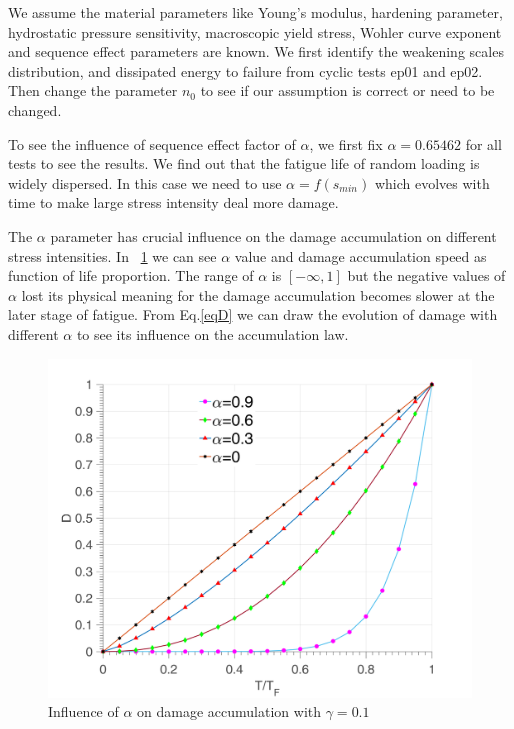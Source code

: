 \documentclass[3p,times,number,review]{elsarticle}
\newcommand{\figref}[1]{\figurename~\ref{#1}}
\begin{document}
We assume the material parameters like Young's modulus, hardening parameter, hydrostatic pressure sensitivity, macroscopic yield stress, Wohler curve exponent and sequence effect parameters are known. We first identify the weakening scales distribution, and dissipated energy to failure from cyclic tests ep01 and ep02. Then change the parameter $n_0$ to see if our assumption is correct or need to be changed. 

To see the influence of sequence effect factor of $\alpha$, we first fix $\alpha=0.65462$ for all tests to see the results. We find out that the fatigue life of random loading is widely dispersed. In this case we need to use $\alpha=f(s_{min})$ which evolves with time to make large stress intensity deal more damage.

The $\alpha$ parameter has crucial influence on the damage accumulation on different stress intensities. In \figref{fig.alpha} we can see $\alpha$ value and damage accumulation speed as function of life proportion. The range of $\alpha$ is $[-\infty,1]$ but the negative values of $\alpha$ lost its physical meaning for the damage accumulation becomes slower at the later stage of fatigue.
From Eq.\eqref{eqD} we can draw the evolution of damage with different $\alpha$ to see its influence on the accumulation law.
\begin{figure}[!h]
	\centering
	\includegraphics[width=\textwidth]{figures//alpha.png} 
	\caption{Influence of $\alpha$ on damage accumulation with $\gamma=0.1$}
	\label{fig.alpha}
\end{figure}
\end{document}
